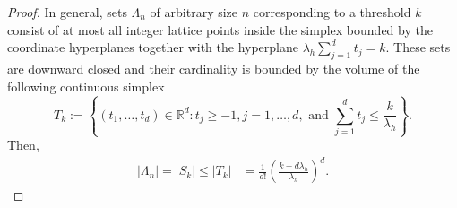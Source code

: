 \documentclass[12pt]{article}
\theoremstyle{remark}
\theoremstyle{definition}
\numberwithin{equation}{section}
\begin{document}
\begin{proof}
    In general, sets $\Lambda_n$ of arbitrary size $n$ corresponding to a threshold $k$ consist of at most all integer lattice points inside the simplex bounded by the coordinate hyperplanes together with the hyperplane $\lambda_{h} \sum_{j=1}^d t_j = k$. These sets are downward closed and their cardinality is bounded by the volume of the following continuous simplex
    \begin{equation}
        T_{k}:=\left\{\left(t_1, \ldots, t_d\right) \in \mathbb{R}^d: t_j \geq-1, j=1, \ldots, d, \text { and } \sum_{j=1}^d t_j \leq \frac{k}{\lambda_{h}} \right\}.
    \end{equation}
    Then,
    \begin{align}
        |\Lambda_n|=|S_{k}|\leq\left|T_k\right|&=\frac{1}{d!} \left(\frac{k+d \lambda_h}{\lambda_h}\right)^d.
        \label{set size}
    \end{align}
    

\end{proof}
\end{document}
